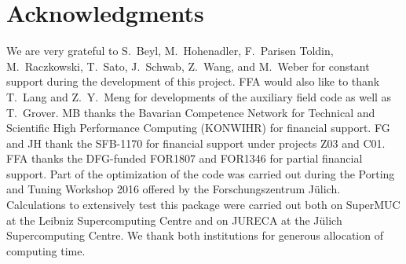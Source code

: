 \section*{Acknowledgments} 

We are very grateful to  S.~Beyl, M.~Hohenadler,  F.~Parisen Toldin,  M.~Raczkowski, T.~Sato, J.~Schwab, Z.~Wang, and M.~Weber  for constant support during the development of this project. 
FFA would also like to thank T.~Lang   and Z.~Y.~Meng for  developments of the auxiliary field code as well as T.~Grover. 
MB thanks the Bavarian Competence Network for Technical and Scientific High Performance Computing (KONWIHR) for financial support. FG  and JH thank the SFB-1170 for  financial support under projects Z03 and C01.  FFA thanks the DFG-funded FOR1807 and FOR1346 for partial financial support.
Part of the optimization of the code was carried out during  the  Porting and Tuning Workshop 2016 offered by the Forschungszentrum J\"ulich.
Calculations  to extensively test this package were carried out both on  SuperMUC at the  Leibniz Supercomputing Centre and on  JURECA  \cite{Jureca16} at the J\"ulich Supercomputing Centre.  We thank both institutions for generous allocation of computing time.
